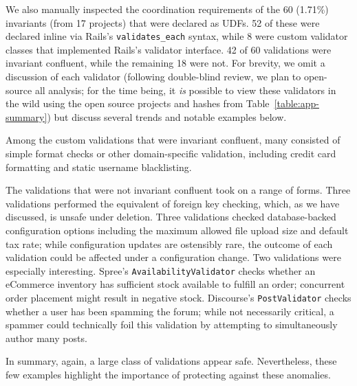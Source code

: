 We also manually inspected the coordination requirements of the 60
(1.71\%) invariants (from 17 projects) that were declared as UDFs. 52
of these were declared inline via Rails's \texttt{validates\_each}
syntax, while 8 were custom validator classes that implemented Rails's
validator interface. 42 of 60 validations were invariant confluent,
while the remaining 18 were not. For brevity, we omit a discussion of
each validator (following double-blind review, we plan to open-source
all analysis; for the time being, it \textit{is} possible to view
these validators in the wild using the open source projects and hashes
from Table~\ref{table:app-summary}) but discuss several trends and
notable examples below.

Among the custom validations that were invariant confluent, many consisted of
simple format checks or other domain-specific validation, including
credit card formatting and static username blacklisting.

The validations that were not invariant confluent took on a range of
forms. Three validations performed the equivalent of foreign key
checking, which, as we have discussed, is unsafe under deletion. Three
validations checked database-backed configuration options including
the maximum allowed file upload size and default tax rate; while
configuration updates are ostensibly rare, the outcome of each
validation could be affected under a configuration change. Two
validations were especially interesting. Spree's
\texttt{AvailabilityValidator} checks whether an eCommerce inventory
has sufficient stock available to fulfill an order; concurrent order
placement might result in negative stock. Discourse's
\texttt{PostValidator} checks whether a user has been spamming the
forum; while not necessarily critical, a spammer could technically
foil this validation by attempting to simultaneously author many posts.

In summary, again, a large class of validations appear safe. Nevertheless,
these few examples highlight the importance of protecting against
these anomalies. 


